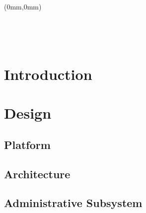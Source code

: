 
%	

	\begin{titlepage}
	\begin{textblock*}{297mm}(0mm,0mm)
		 \hspace{-6.5mm}

		

	\end{textblock*}
	\thispagestyle{empty}

\ \pagebreak{} 
	\end{titlepage}
\ \thispagestyle{empty} \ \pagebreak{}



\tableofcontents
\cleardoublepage
	
\newpage
\thispagestyle{empty}
\begin{titlepage}
\end{titlepage}
	
	\chapter{Introduction}

	
	
	
	
	

	
	
	
	
	\chapter{Design}
		\section{Platform}
		\section{Architecture}
		\section{Administrative Subsystem}
